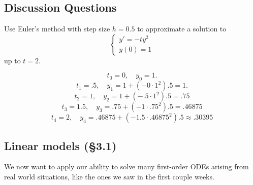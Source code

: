 \documentclass[12pt]{amsart}
\numberwithin{equation}{section}
\theoremstyle{plain} %
\theoremstyle{definition}
\theoremstyle{remark}
\begin{document}
\subsection*{Discussion Questions}
Use Euler's method with step size $h=0.5$ to approximate a solution to 
\[\begin{cases} y' = -ty^2 \\ y(0)=1\end{cases}\]
up to $t=2$.
\begin{framed}
\[ t_0 = 0, \quad y_0=1.\]
\[ t_1 = .5, \quad y_1 = 1 + (- 0 \cdot 1^2) .5 = 1.\]
\[ t_2 = 1, \quad y_2 = 1 + (- .5 \cdot 1^2) .5 = .75\]
\[ t_3 = 1.5 , \quad y_3 = .75 + (- 1 \cdot .75^2) .5 = .46875\]
\[ t_4 = 2 , \quad y_4 = .46875 + (- 1.5 \cdot .46875^2) .5 \approx .30395\]
\end{framed}


\subsection*{Linear models (\S3.1)}

We now want to apply our ability to solve many first-order ODEs arising from real world situations, like the ones we saw in the first couple weeks.
\end{document}
